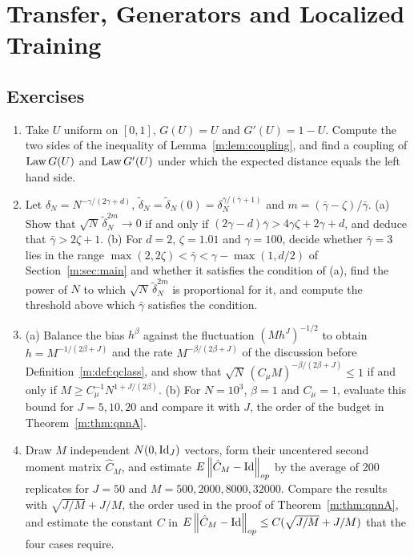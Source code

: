 \chapter{Transfer, Generators and Localized Training}
\label{ch:generators}





\section*{Exercises}
\begin{enumerate}
\item Take $U$ uniform on $[0,1]$, $G(U)=U$ and $G'(U)=1-U$. Compute the two sides of the inequality of Lemma~\ref{m:lem:coupling}, and find a coupling of $\operatorname{Law} G(U)$ and $\operatorname{Law} G'(U)$ under which the expected distance equals the left hand side.
\item Let $\delta_N=N^{-\gamma/(2\gamma+d)}$, $\tilde\delta_N=\tilde\delta_N(0)=\delta_N^{\bar\gamma/(\bar\gamma+1)}$ and $m=(\bar\gamma-\zeta)/\bar\gamma$. (a) Show that $\sqrt N\,\tilde\delta_N^{2m}\to0$ if and only if $(2\gamma-d)\bar\gamma>4\gamma\zeta+2\gamma+d$, and deduce that $\bar\gamma>2\zeta+1$. (b) For $d=2$, $\zeta=1.01$ and $\gamma=100$, decide whether $\bar\gamma=3$ lies in the range $\max(2,2\zeta)<\bar\gamma<\gamma-\max(1,d/2)$ of Section~\ref{m:sec:main} and whether it satisfies the condition of (a), find the power of $N$ to which $\sqrt N\,\tilde\delta_N^{2m}$ is proportional for it, and compute the threshold above which $\bar\gamma$ satisfies the condition.
\item (a) Balance the bias $h^\beta$ against the fluctuation $(Mh^J)^{-1/2}$ to obtain $h=M^{-1/(2\beta+J)}$ and the rate $M^{-\beta/(2\beta+J)}$ of the discussion before Definition~\ref{m:def:qclass}, and show that $\sqrt N\,(C_\mu M)^{-\beta/(2\beta+J)}\le1$ if and only if $M\ge C_\mu^{-1}N^{1+J/(2\beta)}$. (b) For $N=10^3$, $\beta=1$ and $C_\mu=1$, evaluate this bound for $J=5,10,20$ and compare it with $J$, the order of the budget in Theorem~\ref{m:thm:qnnA}.
\item Draw $M$ independent $N(0,\operatorname{Id}_J)$ vectors, form their uncentered second moment matrix $\hat C_M$, and estimate $E\left\|\hat C_M-\operatorname{Id}\right\|_{op}$ by the average of 200 replicates for $J=50$ and $M=500,2000,8000,32000$. Compare the results with $\sqrt{J/M}+J/M$, the order used in the proof of Theorem~\ref{m:thm:qnnA}, and estimate the constant $C$ in $E\left\|\hat C_M-\operatorname{Id}\right\|_{op}\le C(\sqrt{J/M}+J/M)$ that the four cases require.

\end{enumerate}
